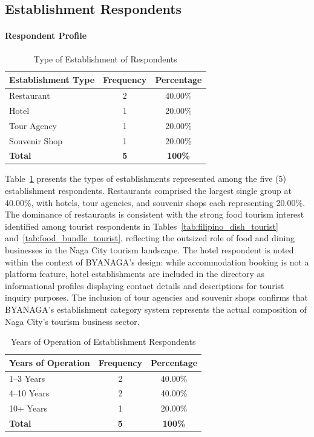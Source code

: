 \documentclass{research}
\begin{document}
\subsection{Establishment Respondents}

\paragraph{Respondent Profile}

\begin{table}[h]
    \centering
    \begin{tabular}{|l|c|c|}
        \hline
        \textbf{Establishment Type} & \textbf{Frequency} & \textbf{Percentage} \\
        \hline
        Restaurant    & 2 & 40.00\% \\
        Hotel         & 1 & 20.00\% \\
        Tour Agency   & 1 & 20.00\% \\
        Souvenir Shop & 1 & 20.00\% \\
        \hline
        \textbf{Total} & \textbf{5} & \textbf{100\%} \\
        \hline
    \end{tabular}
    \caption{Type of Establishment of Respondents}
    \label{tab:estab_type}
\end{table}

Table~\ref{tab:estab_type} presents the types of establishments represented 
among the five (5) establishment respondents. Restaurants comprised the largest 
single group at 40.00\%, with hotels, tour agencies, and souvenir shops each 
representing 20.00\%. The dominance of restaurants is consistent with the strong 
food tourism interest identified among tourist respondents in 
Tables~\ref{tab:filipino_dish_tourist} and~\ref{tab:food_bundle_tourist}, 
reflecting the outsized role of food and dining businesses in the Naga City 
tourism landscape. The hotel respondent is noted within the context of BYANAGA's 
design: while accommodation booking is not a platform feature, hotel 
establishments are included in the directory as informational profiles displaying 
contact details and descriptions for tourist inquiry purposes. The inclusion of 
tour agencies and souvenir shops confirms that BYANAGA's establishment category 
system represents the actual composition of Naga City's tourism business sector.

\begin{table}[h]
    \centering
    \begin{tabular}{|l|c|c|}
        \hline
        \textbf{Years of Operation} & \textbf{Frequency} & \textbf{Percentage} \\
        \hline
        1--3 Years  & 2 & 40.00\% \\
        4--10 Years & 2 & 40.00\% \\
        10+ Years   & 1 & 20.00\% \\
        \hline
        \textbf{Total} & \textbf{5} & \textbf{100\%} \\
        \hline
    \end{tabular}
    \caption{Years of Operation of Establishment Respondents}
    \label{tab:years_operation}
\end{table}
\end{document}

